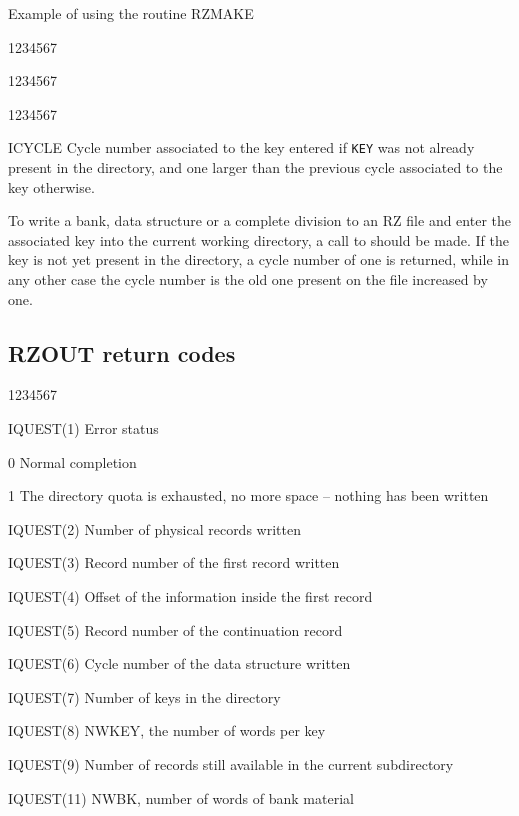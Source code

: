 \begin{XMPt}{Example of using the routine RZMAKE}
\begin{DLtt}{1234567}
\begin{DLtt}{1234567}
\begin{DLtt}{12}
\end{DLtt}
\end{DLtt}
\end{DLtt}
\Odesc
\begin{DLtt}{1234567}
\item[ICYCLE]Cycle number associated to the key entered
 if {\tt KEY}
was not already present in the directory,
and one larger than the previous cycle associated to the key otherwise.
\end{DLtt}
\par 
To write a bank, data structure or a complete division to an RZ file and enter the
associated key
into the current working directory, a call to  should be made.
If the key is not yet present in the directory, a cycle number of
one is returned, while in any other case the cycle number is the old
one present on the file increased by one.
\subsection{RZOUT return codes}
\begin{DLtt}{1234567}
\item[IQUEST(1)]Error status
\begin{DLtt}{12}
\item[0]Normal completion
\item[1]The directory quota is exhausted, no more space
-- nothing has been written
\end{DLtt}
\item[IQUEST(2)]Number of physical records written
\item[IQUEST(3)]Record number of the first record written
\item[IQUEST(4)]Offset of the information inside the first record
\item[IQUEST(5)]Record number of the continuation record
\item[IQUEST(6)]Cycle number of the data structure written
\item[IQUEST(7)]Number of keys in the directory
\item[IQUEST(8)]NWKEY, the number of words per key
\item[IQUEST(9)]Number of records still available in the current subdirectory
\item[ ]
\item[IQUEST(11)]NWBK, number of words of bank material
\end{DLtt}

\end{XMPt}
